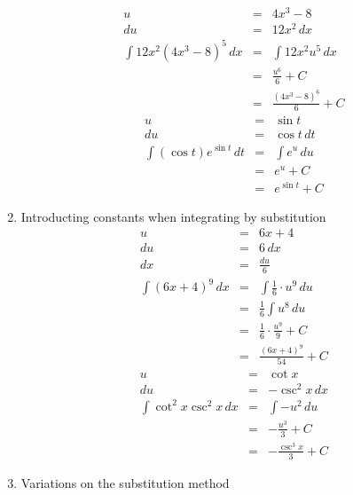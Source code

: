 \documentclass{article}
\begin{document}
\begin{enumerate}
\begin{eqnarray}
            u &=& 4x^3 - 8 \\
            du &=& 12x^2\,dx \\
            \int{12x^2\left(4x^3 - 8\right)^5\,dx} &=& \int{12x^2u^5\,dx} \\
                                                   &=& \frac{u^6}{6} + C \\
                                                   &=& \frac{\left(4x^3 - 8\right)^6}{6} + C
        \end{eqnarray}
        \begin{eqnarray}
            u &=& \sin{t} \\
            du &=& \cos{t}\,dt \\
            \int{\left(\cos{t}\right)e^{\sin{t}}\,dt} &=& \int{e^u\,du} \\
                                                      &=& e^u + C \\
                                                      &=& e^{\sin{t}} + C
        \end{eqnarray}
    \item Introducting constants when integrating by substitution
        \begin{eqnarray}
            u &=& 6x + 4 \\
            du &=& 6\,dx \\
            dx &=& \frac{du}{6} \\
            \int{\left(6x + 4\right)^9\,dx} &=& \int{\frac{1}{6} \cdot u^9\,du} \\
                                            &=& \frac{1}{6}\int{u^8\,du} \\
                                            &=& \frac{1}{6} \cdot \frac{u^9}{9} + C \\
                                            &=& \frac{\left(6x + 4\right)^9}{54} + C
        \end{eqnarray}
        \begin{eqnarray}
            u &=& \cot{x} \\
            du &=& -\csc^2{x}\,dx \\
            \int{\cot^2{x}\csc^2{x}\,dx} &=& \int{-u^2\,du} \\
                                         &=& -\frac{u^3}{3} + C \\
                                         &=& -\frac{\csc^3{x}}{3} + C
        \end{eqnarray}
    \item Variations on the substitution method

\end{enumerate}
\end{document}
